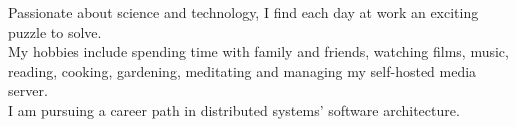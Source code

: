 %
%
%

\vspace{-0.8em}
\vspace{0.5em}
Passionate about science and technology, I find each day at work an exciting puzzle to solve.\\
My hobbies include spending time with family and friends, watching films, music, reading, cooking, gardening, meditating and managing my self-hosted media server.\\
I am pursuing a career path in distributed systems' software architecture.
